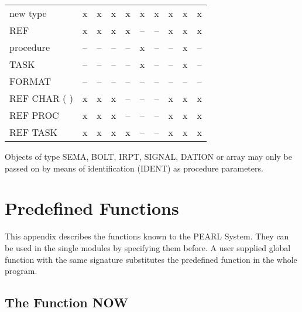 \begin{table}[htb]
\begin{tabular}{lccccccccc}
new type       & x     &  x      & x     &  x     &  x    &   x    &  x  &    x   &  x   \\
REF            & x     &  x      & x     &  x     &  --   &   --   &  x  &    x   &  x   \\
procedure      & --    &  --     & --    &  --    &  x    &   --   &  -- &    x   &  --  \\
TASK           & --    &  --     & --    &  --    &  x    &   --   &  -- &    x   &  --  \\
FORMAT         & --    &  --     & --    &  --    &  --   &   --   &  -- &    --  &  --  \\
REF CHAR ( )   & x     &  x      & x     &  --    &  --   &   --   &  x  &    x   &  x   \\
REF PROC       & x     &  x      & x     &  --    &  --   &   --   &  x  &    x   &  x   \\
REF TASK       & x     &  x      & x     &  x     &  --   &   --   &  x  &    x   &  x   \\
\end{tabular}
\end{table}
                                                                                 
Objects of type SEMA, BOLT, IRPT, SIGNAL, DATION or array may only be 
passed on by means of identification (IDENT) as procedure parameters.

\newpage
\section{Predefined Functions}   %

This appendix describes the functions known to the PEARL
System. They
can be used in the single modules 
by
 specifying them before. 
A user supplied global function with the same signature substitutes
the predefined function in the whole program.

\subsection{The Function NOW}    %

